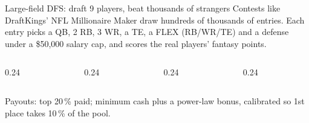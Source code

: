 \begin{frame}{Large-field DFS: draft 9 players, beat thousands of strangers}
  Contests like DraftKings' NFL Millionaire Maker draw hundreds of thousands of entries.
  Each entry picks a QB, 2 RB, 3 WR, a TE, a FLEX (RB/WR/TE) and a defense under a
  \$50{,}000 salary cap, and scores the real players' fantasy points.
  \vspace{1.6em}

  \begin{columns}[t]
    \begin{column}{0.24\textwidth}
    \end{column}
    \begin{column}{0.24\textwidth}
    \end{column}
    \begin{column}{0.24\textwidth}
    \end{column}
    \begin{column}{0.24\textwidth}
    \end{column}
  \end{columns}
  \vfill
  {\scriptsize\color{navy} Payouts: top 20\,\% paid; minimum cash plus a power-law bonus,
  calibrated so 1st place takes 10\,\% of the pool.\par}
\end{frame}

